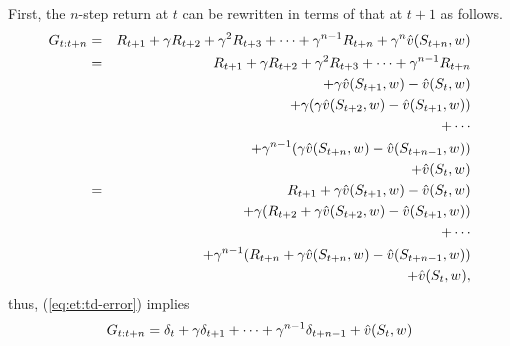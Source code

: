 First, the $n$-step return at $t$ can be rewritten in terms of that at $t+1$ as follows.
\begin{eqnarray*}
G_{{t}:{t+n}}
&=& R_{t+1} + \gamma R_{t+2} + \gamma^2 R_{t+3} + \cdots + \gamma^{n-1} R_{t+n}
+ \gamma^n \hat{v}(S_{t+n}, {w_{}})
\\
&=& R_{t+1} + \gamma R_{t+2} + \gamma^2 R_{t+3} + \cdots + \gamma^{n-1} R_{t+n}
\\
&& + \gamma \hat{v}(S_{t+1}, {w_{}}) - \hat{v}(S_{t}, {w_{}})
\\
&& + \gamma(\gamma \hat{v}(S_{t+2}, {w_{}}) - \hat{v}(S_{t+1}, {w_{}}))
\\
&& + \cdots
\\
&& + \gamma^{n-1} (\gamma \hat{v}(S_{t+n}, {w_{}}) - \hat{v}(S_{t+n-1}, {w_{}}))
\\
&& + \hat{v}(S_{t}, {w_{}})
\\
&=& R_{t+1} + \gamma \hat{v}(S_{t+1}, {w_{}}) - \hat{v}(S_{t}, {w_{}})
\\
&& + \gamma(R_{t+2} + \gamma \hat{v}(S_{t+2}, {w_{}}) - \hat{v}(S_{t+1}, {w_{}}))
\\
&& + \cdots
\\
&& + \gamma^{n-1} (R_{t+n} + \gamma \hat{v}(S_{t+n}, {w_{}}) - \hat{v}(S_{t+n-1}, {w_{}}))
\\
&& + \hat{v}(S_{t}, {w_{}}),
\end{eqnarray*}
thus, (\ref{eq:et:td-error}) implies
\begin{equation}
\label{eq:nusl}
G_{{t}:{t+n}}
= \delta_{t} + \gamma \delta_{t+1} +  \cdots + \gamma^{n-1} \delta_{t+n-1} + \hat{v}(S_{t}, {w_{}})
\end{equation}

